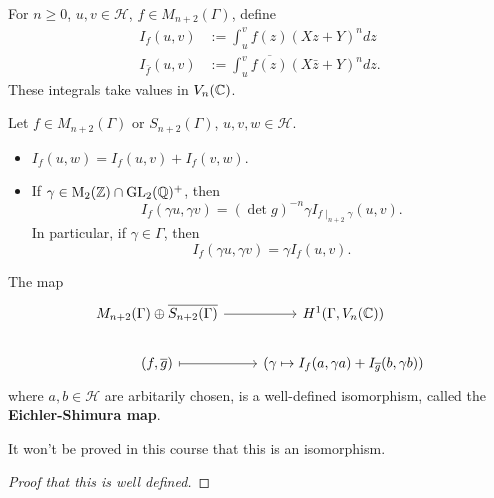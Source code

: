 \begin{definition}
    For $n\ge 0$, $u, v\in \mathcal{H}$, $f\in M_{n+2}(\Gamma)$,
    define \begin{align*}
        I_f(u, v) &:= \int_u^v f(z) (Xz + Y)^n dz\\
        I_{\bar{f}}(u, v) &:=
        \int_u^v \overline{f(z)}(X\bar{z} + Y)^n dz.
    \end{align*}
    These integrals take values in $V_n(\mathbb{C})$.
\end{definition}
\begin{lemma}\label{lem: property of If(u v)}
    Let $f\in M_{n+2}(\Gamma)$ or $S_{n+2}(\Gamma)$, $u, v, w\in\mathcal{H}$.\begin{itemize}
        \item $I_f(u, w) = I_f(u, v) + I_f(v, w)$.
        \item If $\gamma\in \mathrm{M}_2(\mathbb{Z})\cap\operatorname{GL}_2(\mathbb{Q})^+$,
        then \[I_f(\gamma u, \gamma v) = \left( \det g \right)^{-n}\gamma I_{f\mid_{n+2}\gamma}(u, v).\]
        In particular, if $\gamma\in\Gamma$, then \[I_f(\gamma u, \gamma v) = \gamma I_f(u, v).\]
    \end{itemize}
\end{lemma}

\begin{theorem}
    The map
\[\begin{tikzcd}
	{M_{n+2}(\Gamma)\oplus \overline{S_{n+2}(\Gamma)}} & {H^1(\Gamma, V_n(\C))} \\
	{(f, \bar{g})} & {\left( \gamma\mapsto I_f(a, \gamma a) + I_{\bar{g}}(b, \gamma b) \right)}
	\arrow[from=1-1, to=1-2]
	\arrow[maps to, from=2-1, to=2-2]
\end{tikzcd}\]
where $a, b\in\mathcal{H}$ are arbitarily chosen, is a well-defined isomorphism, called the \textbf{Eichler-Shimura map}.
\end{theorem}
It won't be proved in this course that this is an isomorphism.
\begin{proof}
    [Proof that this is well defined]
\end{proof}

















